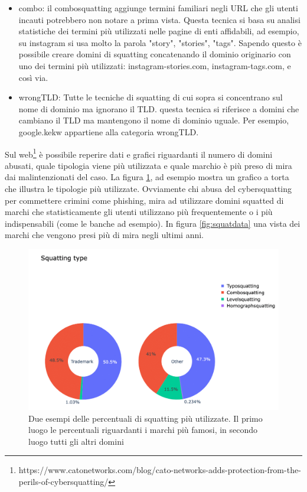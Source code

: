 \begin{itemize}
    \item combo: il combosquatting aggiunge termini familiari negli URL che gli utenti incauti potrebbero non notare a prima vista. Questa tecnica si basa su analisi statistiche dei termini più utilizzati nelle pagine di enti affidabili, ad esempio, su instagram si usa molto la parola "story", "stories", "tags". Sapendo questo è possibile creare domini di squatting concatenando il dominio originario con uno dei termini più utilizzati: instagram-stories.com, instagram-tags.com, e così via.
    
    \item wrongTLD: Tutte le tecniche di squatting di cui sopra si
    concentrano sul nome di dominio ma ignorano il TLD. questa tecnica si riferisce a domini che cambiano il TLD ma mantengono il nome di dominio uguale. Per esempio, google.kekw appartiene alla categoria wrongTLD.
\end{itemize}
Sul web\footnote[1]{https://www.catonetworks.com/blog/cato-networks-adds-protection-from-the-perils-of-cybersquatting/} è possibile reperire dati e grafici riguardanti il numero di domini abusati, quale tipologia viene più utilizzata e quale marchio è più preso di mira dai malintenzionati del caso.
La figura \ref{fig:cakesquatting}, ad esempio mostra un grafico a torta che illustra le tipologie più utilizzate.
Ovviamente chi abusa del cybersquatting per commettere crimini come phishing, mira ad utilizzare domini squatted di marchi che statisticamente gli utenti utilizzano più frequentemente o i più indispensabili (come le banche ad esempio). In figura \ref{fig:squatdata} una vista dei marchi che vengono presi più di mira negli ultimi anni.

\begin{figure}[!h]
  \centering
  \begin{minipage}[b]{0.9\textwidth}
    \includegraphics[width=\textwidth]{pictures/cakesquatting.png}
    \caption{Due esempi delle percentuali di squatting più utilizzate. Il primo luogo le percentuali riguardanti i marchi più famosi, in secondo luogo tutti gli altri domini}
    \label{fig:cakesquatting}
  \end{minipage}
  \hfill
\end{figure}

